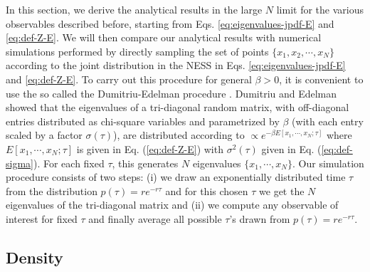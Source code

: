 \documentclass[onecolumn,superscriptaddress,
 amsmath,amssymb,
 aps,
 prd,
]{revtex4-1}
\begin{document}
{In this section, we derive the analytical results in the large $N$ limit for the various observables described before, starting  
from Eqs. \eqref{eq:eigenvalues-jpdf-E} and \eqref{eq:def-Z-E}. We will then compare our analytical results with numerical
simulations performed by directly sampling the set of points $\{x_1, x_2, \cdots, x_N \}$ according to the joint distribution in 
the NESS in Eqs. \eqref{eq:eigenvalues-jpdf-E} and \eqref{eq:def-Z-E}. To carry out this procedure for general $\beta > 0$, 
it is convenient to use the so called the Dumitriu-Edelman procedure \cite{DE02}. Dumitriu and Edelman showed that
the eigenvalues of a tri-diagonal random matrix, with off-diagonal entries distributed as chi-square variables and 
parametrized by $\beta$ (with each entry scaled by a factor $\sigma(\tau)$), are distributed according to $\propto e^{-\beta E[x_1,\cdots,x_N;\tau]}$ where $E[x_1,\cdots,x_N;\tau]$
is given in Eq. (\ref{eq:def-Z-E}) with $\sigma^2(\tau)$ given in Eq. (\ref{eq:def-sigma}). For each fixed $\tau$, this generates $N$ eigenvalues
$\{x_1, \cdots, x_N\}$. Our simulation procedure consists of two steps: (i) we draw an exponentially distributed time $\tau$ from the distribution $p(\tau) = r e^{-r \tau}$ and for this chosen $\tau$ we get the $N$ eigenvalues of the tri-diagonal matrix and (ii) we compute any observable of interest for fixed $\tau$ and
finally average all possible $\tau$'s drawn from $p(\tau) = r e^{-r \tau}$.  

 




  













\subsection{Density} \label{sec:model-density}

}
\end{document}
